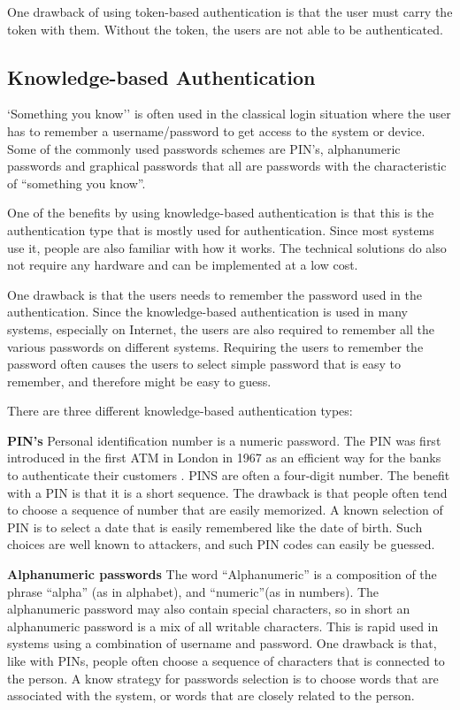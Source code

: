     One drawback of using token-based authentication is that the user must carry the token with them. Without the token, the users are not able to be authenticated. 

    \subsection{Knowledge-based Authentication}
    `Something you know'' is often used in the classical login situation where the user has to remember a username/password to get access to the system or device. Some of the commonly used passwords schemes are PIN's, alphanumeric passwords and graphical passwords that all are passwords with the characteristic of ``something you know''.

    One of the benefits by using knowledge-based authentication is that this is the authentication type that is mostly used for authentication. Since most systems use it, people are also familiar with how it works. The technical solutions do also not require any hardware and can be implemented at a low cost.

    One drawback is that the users needs to remember the password used in the authentication. Since the knowledge-based authentication is used in many systems, especially on Internet, the users are also required to remember all the various passwords on different systems. Requiring the users to remember the password often causes the users to select simple password that is easy to remember, and therefore might be easy to guess.

    There are three different knowledge-based authentication types:

    {\bf PIN's} Personal identification number is a numeric password. The PIN was first introduced in the first ATM in London in 1967 as an efficient way for the banks to authenticate their customers \cite{Bonneau1}. PINS are often a four-digit number. The benefit with a PIN is that it is a short sequence. The drawback is that people often tend to choose a sequence of number that are easily memorized. A known selection of PIN is to select a date that is easily remembered like the date of birth. Such choices are well known to attackers, and such PIN codes can easily be guessed.

    {\bf Alphanumeric passwords}
    The word ``Alphanumeric'' is a composition of the phrase ``alpha'' (as in alphabet), and ``numeric''(as in numbers). The alphanumeric password may also contain special characters, so in short an alphanumeric password is a mix of all writable characters. This is rapid used in systems using a combination of username and password. One drawback is that, like with PINs, people often choose a sequence of characters that is connected to the person. A know strategy for passwords selection is to choose words that are associated with the system, or words that are closely related to the person.

